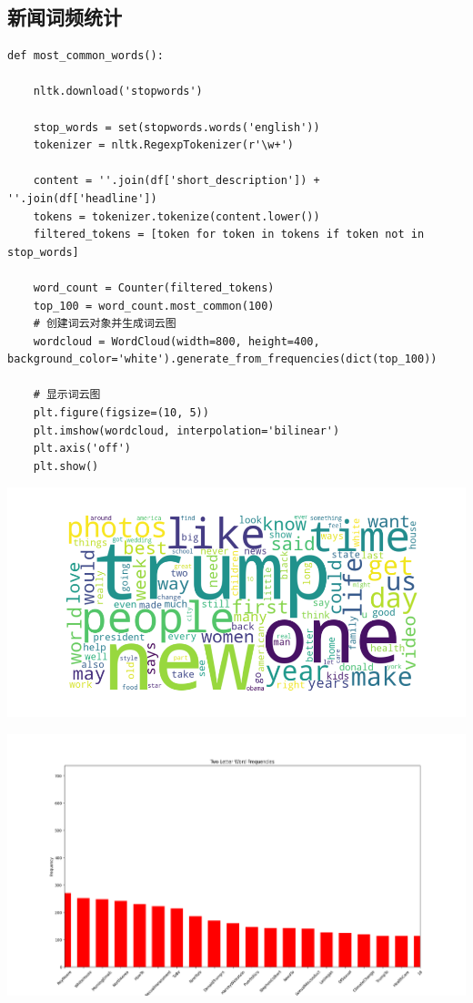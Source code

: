 \documentclass{article}
\begin{document}
\subsection{新闻词频统计}
\begin{lstlisting}
def most_common_words():

    nltk.download('stopwords')

    stop_words = set(stopwords.words('english'))
    tokenizer = nltk.RegexpTokenizer(r'\w+')

    content = ''.join(df['short_description']) + ''.join(df['headline'])
    tokens = tokenizer.tokenize(content.lower())
    filtered_tokens = [token for token in tokens if token not in stop_words]

    word_count = Counter(filtered_tokens)
    top_100 = word_count.most_common(100)
    # 创建词云对象并生成词云图
    wordcloud = WordCloud(width=800, height=400, background_color='white').generate_from_frequencies(dict(top_100))

    # 显示词云图
    plt.figure(figsize=(10, 5))
    plt.imshow(wordcloud, interpolation='bilinear')
    plt.axis('off')
    plt.show()
\end{lstlisting}

\begin{center}
    \includegraphics[width=1\linewidth]{词云.png}
\end{center}
\begin{center}
    \includegraphics[width=1\linewidth]{词组的词频.png}
\end{center}
\end{document}
